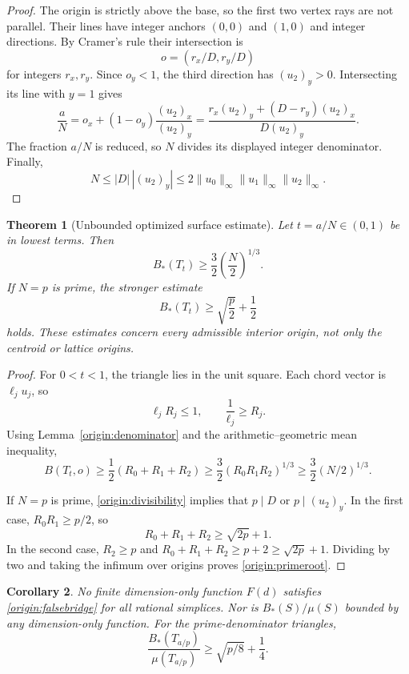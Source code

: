\documentclass[11pt,a4paper]{article}
\newtheorem{theorem}{Theorem}[section]
\newtheorem{corollary}[theorem]{Corollary}
\theoremstyle{remark}\newtheorem{remark}[theorem]{Remark}
\newcommand{\Bopt}{B_*}
\begin{document}
\begin{proof}
The origin is strictly above the base, so the first two vertex
rays are not parallel. Their lines have integer anchors $(0,0)$
and $(1,0)$ and integer directions. By Cramer's rule their
intersection is
\[
 o=(r_x/D,r_y/D)
\]
for integers $r_x,r_y$. Since $o_y<1$, the third direction has
$(u_2)_y>0$. Intersecting its line with $y=1$ gives
\[
 \frac aN=o_x+(1-o_y)\frac{(u_2)_x}{(u_2)_y}
 =\frac{r_x(u_2)_y+(D-r_y)(u_2)_x}{D(u_2)_y}.
\]
The fraction $a/N$ is reduced, so $N$ divides its displayed
integer denominator. Finally,
\[
 N\le |D|\,|(u_2)_y|
 \le2\|u_0\|_\infty\|u_1\|_\infty\|u_2\|_\infty.
\]
\end{proof}

\begin{theorem}[Unbounded optimized surface estimate]\label{origin:main}
Let $t=a/N\in(0,1)$ be in lowest terms. Then
\begin{equation}\label{origin:cubicroot}
 \boxed{\displaystyle
 \Bopt(T_t)\ge\frac32\left(\frac N2\right)^{1/3}.}
\end{equation}
If $N=p$ is prime, the stronger estimate
\begin{equation}\label{origin:primeroot}
 \boxed{\displaystyle
 \Bopt(T_t)\ge\sqrt{\frac p2}+\frac12}
\end{equation}
holds. These estimates concern every admissible interior origin,
not only the centroid or lattice origins.
\end{theorem}

\begin{proof}
For $0<t<1$, the triangle lies in the unit square. Each chord
vector is $\ell_j u_j$, so
\[
 \ell_jR_j\le1,\qquad \frac1{\ell_j}\ge R_j.
\]
Using Lemma~\ref{origin:denominator} and the arithmetic--geometric
mean inequality,
\[
 B(T_t,o)\ge\frac12(R_0+R_1+R_2)
 \ge\frac32(R_0R_1R_2)^{1/3}
 \ge\frac32(N/2)^{1/3}.
\]

If $N=p$ is prime, \eqref{origin:divisibility} implies that
$p\mid D$ or $p\mid(u_2)_y$. In the first case,
$R_0R_1\ge p/2$, so
\[
 R_0+R_1+R_2\ge\sqrt{2p}+1.
\]
In the second case, $R_2\ge p$ and
$R_0+R_1+R_2\ge p+2\ge\sqrt{2p}+1$.
Dividing by two and taking the infimum over origins proves
\eqref{origin:primeroot}.
\end{proof}

\begin{corollary}\label{origin:failure}
No finite dimension-only function $F(d)$ satisfies
\eqref{origin:falsebridge} for all rational simplices. Nor is
$\Bopt(S)/\mu(S)$ bounded by any dimension-only function.
For the prime-denominator triangles,
\[
 \frac{\Bopt(T_{a/p})}{\mu(T_{a/p})}
 \ge\sqrt{p/8}+\frac14.
\]
\end{corollary}
\end{document}
